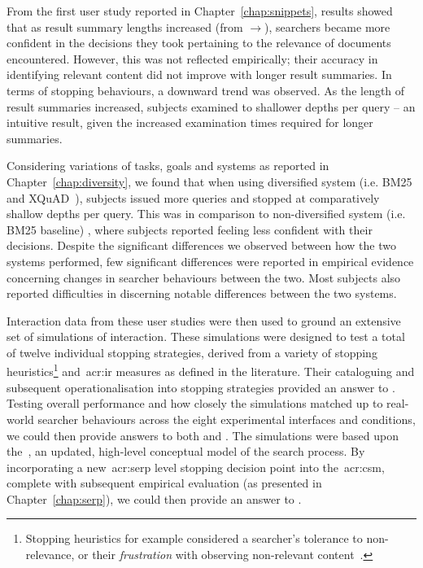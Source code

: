 From the first user study reported in Chapter~\ref{chap:snippets}, results showed that as result summary lengths increased (from $\rightarrow$), searchers became more confident in the decisions they took pertaining to the relevance of documents encountered. However, this was not reflected empirically; their accuracy in identifying relevant content did not improve with longer result summaries. In terms of stopping behaviours, a downward trend was observed. As the length of result summaries increased, subjects examined to shallower depths per query -- an intuitive result, given the increased examination times required for longer summaries.

Considering variations of tasks, goals and systems as reported in Chapter~\ref{chap:diversity}, we found that when using diversified system  (i.e. BM25 and XQuAD~\citep{santos2010query_reformulations_diversification}), subjects issued more queries and stopped at comparatively shallow depths per query. This was in comparison to non-diversified system (i.e. BM25 baseline) , where subjects reported feeling less confident with their decisions. Despite the significant differences we observed between how the two systems performed, few significant differences were reported in empirical evidence concerning changes in searcher behaviours between the two. Most subjects also reported difficulties in discerning notable differences between the two systems.

Interaction data from these user studies were then used to ground an extensive set of simulations of interaction. These simulations were designed to test a total of twelve individual stopping strategies, derived from a variety of stopping heuristics\footnote{Stopping heuristics for example considered a searcher's tolerance to non-relevance, or their \emph{frustration} with observing non-relevant content~\citep{kraft1979stopping_rules}.} and~\gls{acr:ir} measures as defined in the literature. Their cataloguing and subsequent operationalisation into stopping strategies provided an answer to . Testing overall performance and how closely the simulations matched up to real-world searcher behaviours across the eight experimental interfaces and conditions, we could then provide answers to both  and . The simulations were based upon the~, an updated, high-level conceptual model of the search process. By incorporating a new~\gls{acr:serp} level stopping decision point into the~\gls{acr:csm}, complete with subsequent empirical evaluation (as presented in Chapter~\ref{chap:serp}), we could then provide an answer to .

